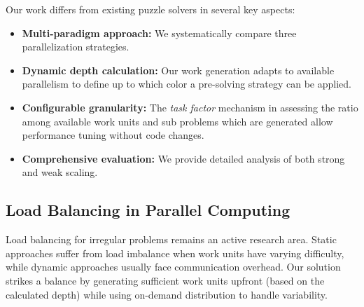 Our work differs from existing puzzle solvers in several key aspects:
\begin{itemize}
    \item \textbf{Multi-paradigm approach:} We systematically compare three parallelization strategies.
    \item \textbf{Dynamic depth calculation:} Our work generation adapts to available parallelism to define up to which color a pre-solving strategy can be applied.
    \item \textbf{Configurable granularity:} The \textit{task factor} mechanism in assessing the ratio among available work units and sub problems which are generated allow performance tuning without code changes.
    \item \textbf{Comprehensive evaluation:} We provide detailed analysis of both strong and weak scaling.
\end{itemize}

\subsection{Load Balancing in Parallel Computing}
\label{subsec:load_balancing_in_parallel_computing}
Load balancing for irregular problems remains an active research area. Static approaches suffer from load imbalance when work units have varying difficulty, while dynamic approaches usually face communication overhead. Our solution strikes a balance by generating sufficient work units upfront (based on the calculated depth) while using on-demand distribution to handle variability.
